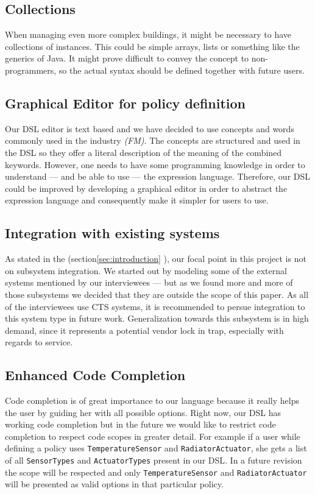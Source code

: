 \subsection{Collections}\label{subsec:collections}
When managing even more complex buildings, it might be necessary to have collections of instances. This could be simple arrays, lists or something like the generics of Java. It might prove difficult to convey the concept to non-programmers, so the actual syntax should be defined together with future users.

\subsection{Graphical Editor for policy definition}\label{subsec:graphicaleditor}
Our DSL editor is text based and we have decided to use concepts and words commonly used in the industry \textit{(FM)}. The concepts are structured and used in the DSL so they offer a literal description of the meaning of the combined keywords. However, one needs to have some programming knowledge in order to understand --- and be able to use --- the expression language. Therefore, our DSL could be improved by developing a graphical editor in order to abstract the expression language and consequently make it simpler for users to use.

\subsection{Integration with existing systems}\label{subsec:integration}
As stated in the (section\ref{sec:introduction} ), our focal point in this project is not on subsystem integration. We started out by modeling some of the external systems mentioned by our interviewees --- but as we found more and more of those subsystems we decided that they are outside the scope of this paper. As all of the interviewees use CTS systems, it is recommended to persue integration to this system type in future work. Generalization towards this subsystem is in high demand, since it represents a potential vendor lock in trap, especially with regards to service.

\subsection{Enhanced Code Completion}\label{subsec:codecompletion}
Code completion is of great importance to our language because it really helps the user by guiding her with all possible options. Right now, our DSL has working code completion but in the future we would like to restrict code completion to respect code scopes in greater detail. For example if a user while defining a policy uses \texttt{TemperatureSensor} and \texttt{RadiatorActuator}, she gets a list of all \texttt{SensorTypes} and \texttt{ActuatorTypes} present in our DSL. In a future revision the scope will be respected and only \texttt{TemperatureSensor} and \texttt{RadiatorActuator} will be presented as valid options in that particular policy.

